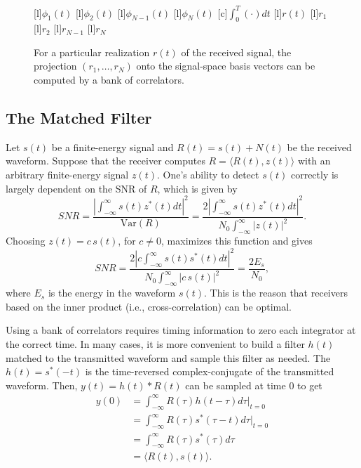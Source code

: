 \begin{figure}
\begin{center}
\begin{psfrags}
[l]{$\phi_1(t)$}
[l]{$\phi_2(t)$}
[l]{$\phi_{N-1}(t)$}
[l]{$\phi_N(t)$}
[c]{$\int_{0}^T (\cdot) dt$}
[l]{$r(t)$}
[l]{$r_1$}
[l]{$r_2$}
[l]{$r_{N-1}$}
[l]{$r_N$}
\end{psfrags}
\end{center}
\caption{For a particular realization $r(t)$ of the received signal, the projection $(r_1,\ldots,r_N)$ onto the signal-space basis vectors can be computed by a bank of correlators.}
\end{figure}

\subsection{The Matched Filter}

Let $s(t)$ be a finite-energy signal and $R(t)=s(t)+N(t)$ be the received waveform.
Suppose that the receiver computes $R = \langle R(t), z(t) \rangle$ with an arbitrary finite-energy signal $z(t)$.
One's ability to detect $s(t)$ correctly is largely dependent on the SNR of $R$, which is given by
\[ SNR = \frac{\left|\int_{-\infty}^{\infty} s(t)z^* (t) dt \right|^2}{\mathrm{Var}(R)}
= \frac{2\left|\int_{-\infty}^{\infty} s(t)z^* (t) dt \right|^2}{N_0 \int_{-\infty}^{\infty} \left| z(t) \right|^2}. \]
Choosing $z(t) = c \, s(t)$, for $c\neq 0$, maximizes this function and gives
\[ SNR = \frac{2\left|c \int_{-\infty}^{\infty} s(t) s^* (t) dt \right|^2}{N_0 \int_{-\infty}^{\infty} \left| c\, s(t) \right|^2}
= \frac{2 E_s}{N_0}, \]
where $E_s$ is the energy in the waveform $s(t)$.
This is the reason that receivers based on the inner product (i.e., cross-correlation) can be optimal.

Using a bank of correlators requires timing information to zero each integrator at the correct time.
In many cases, it is more convenient to build a filter $h(t)$ matched to the transmitted waveform and sample this filter as needed.
The  $h(t) = s^* (-t)$ is the time-reversed complex-conjugate of the transmitted waveform.
Then, $y(t) = h(t) * R(t)$ can be sampled at time $0$ to get
\begin{align*}
y(0)
&= \int_{-\infty}^{\infty} R(\tau) h(t-\tau) d \tau \bigg|_{t = 0} \\
&= \int_{-\infty}^{\infty} R(\tau) s^* (\tau-t) d \tau \bigg|_{t = 0} \\
&= \int_{-\infty}^{\infty} R(\tau) s^* (\tau) d \tau \\
&= \langle R(t) , s(t) \rangle.
\end{align*}

